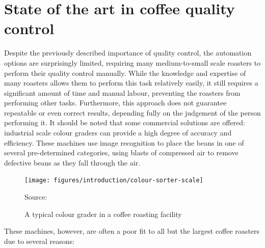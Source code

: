 \section{State of the art in coffee quality control}\label{sec:qc-state-of-the-art}
Despite the previously described importance of quality control, the automation options are surprisingly limited,
requiring many medium-to-small scale roasters to perform their quality control manually.
While the knowledge and expertise of many roasters allows them to perform this task relatively easily,
it still requires a significant amount of time and manual labour, preventing the roasters from performing other tasks.
Furthermore, this approach does not guarantee repeatable or even correct results,
depending fully on the judgement of the person performing it.
\pagebreak
It should be noted that some commercial solutions are offered:
industrial scale colour graders can provide a high degree of accuracy and efficiency.
These machines use image recognition to place the beans in one of several pre-determined categories,
using blasts of compressed air to remove defective beans as they fall through the air.
\begin{figure}
    \texttt{[image: figures/introduction/colour-sorter-scale]}
    \caption*{Source: \cite{colourSorterImg}}
    \caption{A typical colour grader in a coffee roasting facility}
    \label{fig:colourSorterExample}
    \vspace{-3em}
\end{figure}
These machines, however, are often a poor fit to all but the largest coffee roasters due to several reasons:
